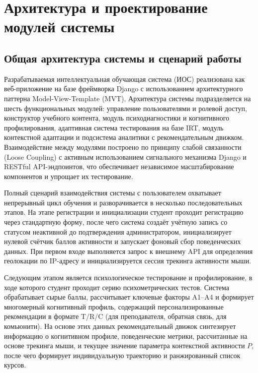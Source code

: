 \section{Архитектура и проектирование модулей системы}

\subsection{Общая архитектура системы и сценарий работы}

Разрабатываемая интеллектуальная обучающая система (ИОС) реализована как веб-приложение на 
базе фреймворка Django с использованием архитектурного паттерна Model-View-Template (MVT). 
Архитектура системы подразделяется на шесть функциональных модулей: управление пользователями 
и ролевой доступ, конструктор учебного контента, модуль психодиагностики и когнитивного 
профилирования, адаптивная система тестирования на базе IRT, модуль контекстной адаптации 
и подсистема аналитики с рекомендательным движком. Взаимодействие между модулями построено 
по принципу слабой связанности (Loose Coupling) с активным использованием сигнального механизма Django и RESTful API-эндпоинтов, что обеспечивает независимое масштабирование компонентов и упрощает их тестирование.

Полный сценарий взаимодействия системы с пользователем охватывает непрерывный цикл обучения 
и разворачивается в несколько последовательных этапов. На этапе регистрации и инициализации 
студент проходит регистрацию через стандартную форму, после чего система создаёт учётную запись 
со статусом неактивной до подтверждения администратором, инициализирует нулевой счётчик баллов 
активности и запускает фоновый сбор поведенческих данных. При первом входе выполняется запрос к 
внешнему API для определения геолокации по IP-адресу и инициализируется сессия трекинга активности мыши.

Следующим этапом является психологическое тестирование и профилирование, в ходе которого студент 
проходит серию психометрических тестов. Система обрабатывает сырые баллы, рассчитывает ключевые 
факторы A1--A4 и формирует многомерный когнитивный профиль, содержащий персонализированные 
рекомендации в формате T/R/C (для преподавателя, обратная связь, для комьюнити). На основе 
этих данных рекомендательный движок синтезирует информацию о когнитивном профиле, поведенческие 
метрики, рассчитанные на основе трекинга мыши, и текущее значение параметра контекстной 
активности $P$, после чего формирует индивидуальную траекторию и ранжированный список курсов.

